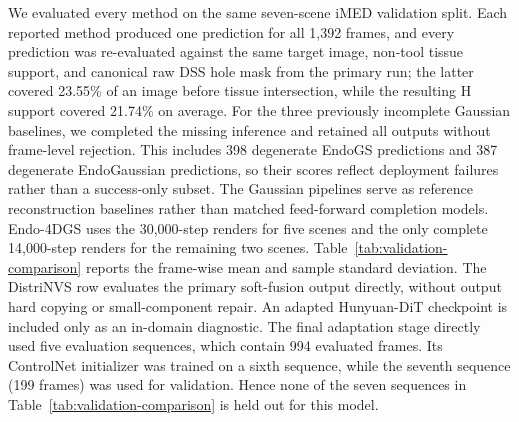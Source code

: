 \documentclass[letterpaper,10pt,conference]{ieeeconf}
\begin{document}
We evaluated every method on the same seven-scene iMED validation split. Each
reported method produced one prediction for all 1,392 frames, and every
prediction was re-evaluated against the same target image, non-tool tissue
support, and canonical raw DSS hole mask from the primary run; the latter
covered 23.55\% of an image before tissue intersection, while the resulting H
support covered 21.74\% on average. For the three
previously incomplete Gaussian baselines, we completed the missing inference
and retained all outputs without frame-level rejection. This includes 398
degenerate EndoGS predictions and 387 degenerate EndoGaussian predictions, so
their scores reflect deployment failures rather than a success-only subset.
The Gaussian pipelines serve as reference reconstruction baselines rather than
matched feed-forward completion models.
Endo-4DGS uses the 30,000-step renders for five scenes and the only complete
14,000-step renders for the remaining two scenes.
Table~\ref{tab:validation-comparison} reports the frame-wise mean and sample
standard deviation. The DistriNVS row evaluates the primary soft-fusion output
directly, without output hard copying or small-component repair.
An adapted Hunyuan-DiT checkpoint is included only as an in-domain diagnostic.
The final adaptation stage directly used five evaluation sequences, which
contain 994 evaluated frames. Its ControlNet initializer was trained on a sixth
sequence, while the seventh sequence (199 frames) was used for validation.
Hence none of the seven sequences in Table~\ref{tab:validation-comparison} is
held out for this model.
\end{document}
